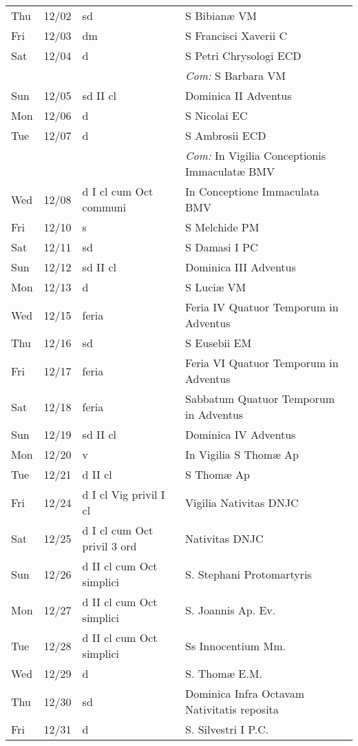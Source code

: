 \documentclass[10pt]{article}
\begin{document}
\begin{longtable}{ l l l l }
Thu & 12/02 & sd & S Bibianæ VM\\
Fri & 12/03 & dm & S Francisci Xaverii C\\
Sat & 12/04 & d & S Petri Chrysologi ECD\\
 & & & \textit{Com:} S Barbara VM\\
Sun & 12/05 & sd II cl & Dominica II Adventus\\
Mon & 12/06 & d & S Nicolai EC\\
Tue & 12/07 & d & S Ambrosii ECD\\
 & & & \textit{Com:} In Vigilia Conceptionis Immaculatæ BMV\\
Wed & 12/08 & d I cl cum Oct communi & In Conceptione Immaculata BMV\\
Fri & 12/10 & s & S Melchide PM\\
Sat & 12/11 & sd & S Damasi I PC\\
Sun & 12/12 & sd II cl & Dominica III Adventus\\
Mon & 12/13 & d & S Luciæ VM\\
Wed & 12/15 & feria & Feria IV Quatuor Temporum in Adventus\\
Thu & 12/16 & sd & S Eusebii EM\\
Fri & 12/17 & feria & Feria VI Quatuor Temporum in Adventus\\
Sat & 12/18 & feria & Sabbatum Quatuor Temporum in Adventus\\
Sun & 12/19 & sd II cl & Dominica IV Adventus\\
Mon & 12/20 & v & In Vigilia S Thomæ Ap\\
Tue & 12/21 & d II cl & S Thomæ Ap\\
Fri & 12/24 & d I cl Vig privil I cl & Vigilia Nativitas DNJC\\
Sat & 12/25 & d I cl cum Oct privil 3 ord & Nativitas DNJC\\
Sun & 12/26 & d II cl cum Oct simplici & S. Stephani Protomartyris\\
Mon & 12/27 & d II cl cum Oct simplici & S. Joannis Ap. Ev.\\
Tue & 12/28 & d II cl cum Oct simplici & Ss Innocentium Mm.\\
Wed & 12/29 & d & S. Thomæ E.M.\\
Thu & 12/30 & sd & Dominica Infra Octavam Nativitatis reposita\\
Fri & 12/31 & d & S. Silvestri I P.C.\\
\end{longtable}
\end{document}
